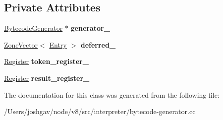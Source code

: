 \subsection*{Private Attributes}
\begin{DoxyCompactItemize}
\item 
\hyperlink{classv8_1_1internal_1_1interpreter_1_1_bytecode_generator}{Bytecode\+Generator} $\ast$ {\bfseries generator\+\_\+}\hypertarget{classv8_1_1internal_1_1interpreter_1_1_bytecode_generator_1_1_control_scope_1_1_deferred_commands_abaeb5e31da966f9e1d33abfc4e5d3c04}{}\label{classv8_1_1internal_1_1interpreter_1_1_bytecode_generator_1_1_control_scope_1_1_deferred_commands_abaeb5e31da966f9e1d33abfc4e5d3c04}

\item 
\hyperlink{classv8_1_1internal_1_1_zone_vector}{Zone\+Vector}$<$ \hyperlink{structv8_1_1internal_1_1interpreter_1_1_bytecode_generator_1_1_control_scope_1_1_deferred_commands_1_1_entry}{Entry} $>$ {\bfseries deferred\+\_\+}\hypertarget{classv8_1_1internal_1_1interpreter_1_1_bytecode_generator_1_1_control_scope_1_1_deferred_commands_a6c4e63088115aad84b44e107555db3f1}{}\label{classv8_1_1internal_1_1interpreter_1_1_bytecode_generator_1_1_control_scope_1_1_deferred_commands_a6c4e63088115aad84b44e107555db3f1}

\item 
\hyperlink{classv8_1_1internal_1_1interpreter_1_1_register}{Register} {\bfseries token\+\_\+register\+\_\+}\hypertarget{classv8_1_1internal_1_1interpreter_1_1_bytecode_generator_1_1_control_scope_1_1_deferred_commands_a00db1ca716d184d571425dbc11d810fe}{}\label{classv8_1_1internal_1_1interpreter_1_1_bytecode_generator_1_1_control_scope_1_1_deferred_commands_a00db1ca716d184d571425dbc11d810fe}

\item 
\hyperlink{classv8_1_1internal_1_1interpreter_1_1_register}{Register} {\bfseries result\+\_\+register\+\_\+}\hypertarget{classv8_1_1internal_1_1interpreter_1_1_bytecode_generator_1_1_control_scope_1_1_deferred_commands_aed8b6b77c55429125d9f41deb3ee7b5d}{}\label{classv8_1_1internal_1_1interpreter_1_1_bytecode_generator_1_1_control_scope_1_1_deferred_commands_aed8b6b77c55429125d9f41deb3ee7b5d}

\end{DoxyCompactItemize}


The documentation for this class was generated from the following file\+:\begin{DoxyCompactItemize}
\item 
/\+Users/joshgav/node/v8/src/interpreter/bytecode-\/generator.\+cc\end{DoxyCompactItemize}
